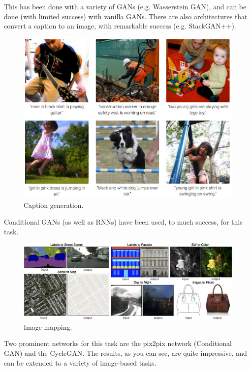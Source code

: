\documentclass{article}
\begin{document}
    This has been done with a variety of GANs (e.g. Wasserstein GAN), and can be done (with limited success) with vanilla GANs. There are also architectures that convert a caption to an image, with remarkable success (e.g. StackGAN++).
    
    
    \begin{figure}[H]
        \centerline{\includegraphics[scale=0.3]{caption_generation.png}}
        \caption{Caption generation.}
        \label{fig:caption_generation}
    \end{figure}
    
    Conditional GANs (as well as RNNs) have been used, to much success, for this task.
    
    
    
    \begin{figure}[H]
        \centerline{\includegraphics[scale=0.2]{pix2pix.jpg}}
        \caption{Image mapping.}
        \label{fig:mapping}
    \end{figure}
    
    Two prominent networks for this task are the pix2pix network (Conditional GAN) and the CycleGAN. The results, as you can see, are quite impressive, and can be extended to a variety of image-based tasks.
    
\end{document}
